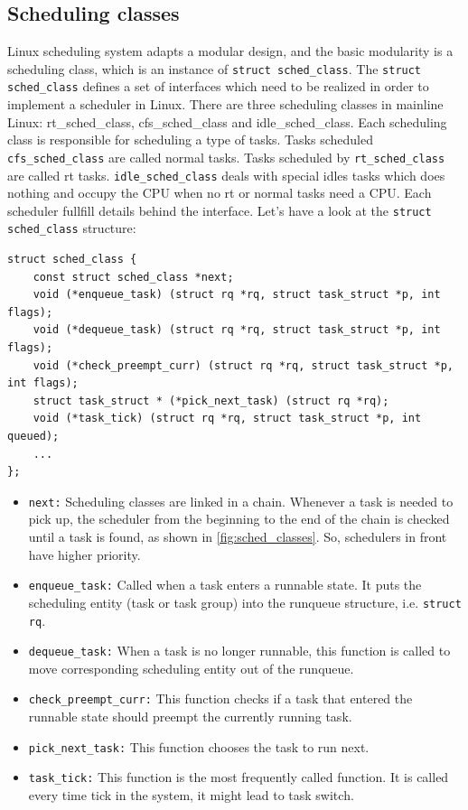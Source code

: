 \subsection{Scheduling classes\label{sec:LinuxSched_classes}}
Linux scheduling system adapts a modular design, and the basic modularity is
a scheduling class, which is an instance of \texttt{struct sched\_class}. 
The \texttt{struct sched\_class} defines a set of interfaces which need to be 
realized in order to implement a scheduler in Linux. 
There are three scheduling classes in mainline Linux: rt\_sched\_class,
cfs\_sched\_class and idle\_sched\_class. Each scheduling class is 
responsible for scheduling a type of tasks. Tasks scheduled
\texttt{cfs\_sched\_class} are called normal tasks. Tasks scheduled
by \texttt{rt\_sched\_class} are called rt tasks. 
\texttt{idle\_sched\_class} deals with special idles tasks which
does nothing and occupy the CPU when no rt or normal tasks need
a CPU.
Each scheduler fullfill
details behind the interface. Let's have a look at the 
\texttt{struct sched\_class} structure:
\begin{lstlisting}
struct sched_class {
	const struct sched_class *next;
	void (*enqueue_task) (struct rq *rq, struct task_struct *p, int flags);
	void (*dequeue_task) (struct rq *rq, struct task_struct *p, int flags);
	void (*check_preempt_curr) (struct rq *rq, struct task_struct *p, int flags);
	struct task_struct * (*pick_next_task) (struct rq *rq);
	void (*task_tick) (struct rq *rq, struct task_struct *p, int queued);
	...
};
\end{lstlisting}
\begin{itemize} 
\item \texttt{next:}
	Scheduling classes are linked in a chain. Whenever a task is needed 
	to pick up, the scheduler from the beginning to the end of the chain 
	is checked until a task is found, as shown in \ref{fig:sched_classes}. 
	So, schedulers in front have higher priority. 
\item \texttt{enqueue\_task:}
	Called when a task enters a runnable state. It puts the scheduling 
	entity (task or task group) into the runqueue structure, 
	i.e. \texttt{struct rq}.
\item \texttt{dequeue\_task:}
	When a task is no longer runnable, this function is called to move
	corresponding scheduling entity out of the runqueue.
\item \texttt{check\_preempt\_curr:}
	This function checks if a task that entered the runnable state 
	should preempt the currently running task.
\item \texttt{pick\_next\_task:}
	This function chooses the task to run next.
\item \texttt{task\_tick:}
	This function is the most frequently called function. 
	It is called every time tick in the system, it might lead to task
	switch.
\end{itemize} 
